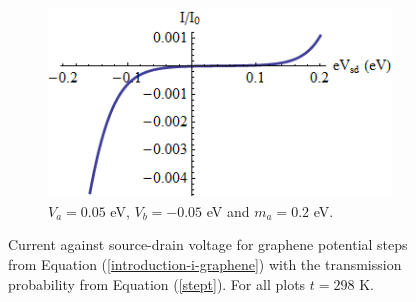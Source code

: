 \begin{figure}[h]
\begin{subfigure}[h]{0.3\textwidth}
				\centerline{\includegraphics[scale=0.35]{images/step-v-3}}
				\caption{$V_{a}=0.05$ eV, $V_{b}=-0.05$ eV and $m_{a}=0.2$ eV.}
			\end{subfigure}
			\caption{Current against source-drain voltage for graphene potential steps from Equation (\ref{introduction-i-graphene}) with the transmission probability from Equation (\ref{stept}). For all plots $t=298$ K.}
			\label{step-iv}
		\end{figure}

